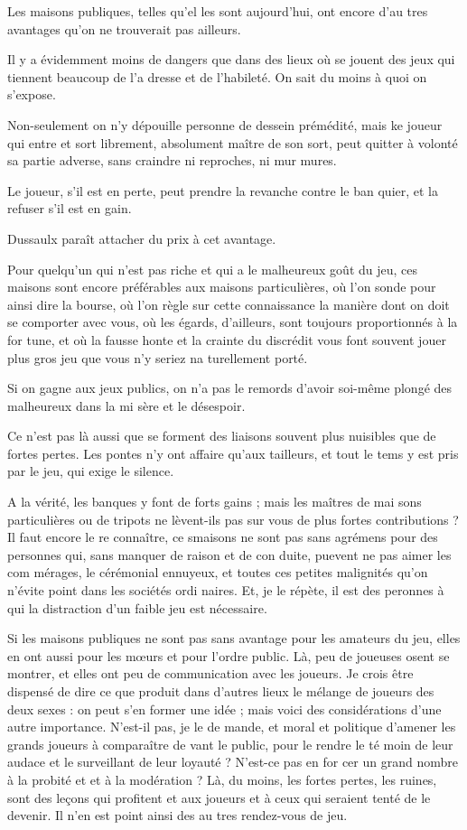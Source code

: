 Les maisons publiques, telles qu'el%
les sont aujourd'hui, ont encore d'au%
tres avantages qu'on ne trouverait
pas ailleurs.

Il y a évidemment moins de dangers
que dans des lieux où se jouent des
jeux qui tiennent beaucoup de l'a%
dresse et de l'habileté. On sait du
moins à quoi on s'expose.

Non-seulement on n'y dépouille
personne de dessein prémédité, mais
ke joueur qui entre et sort librement,
absolument maître de son sort, peut
quitter à volonté sa partie adverse,
sans craindre ni reproches, ni mur%
mures.

Le joueur, s'il est en perte, peut
prendre la revanche contre le ban%
quier, et la refuser s'il est en gain.

Dussaulx paraît attacher du prix à
cet avantage.

Pour quelqu'un qui n'est pas riche
et qui a le malheureux goût du jeu,
ces maisons sont encore préférables
aux maisons particulières, où l'on
sonde pour ainsi dire la bourse, où
l'on règle sur cette connaissance la
manière dont on doit se comporter 
avec vous, où les égards, d'ailleurs,
sont toujours proportionnés à la for%
tune, et où la fausse honte et la crainte
du discrédit vous font souvent jouer
plus gros jeu que vous n'y seriez na%
turellement porté.

Si on gagne aux jeux publics, on
n'a pas le remords d'avoir soi-même
plongé des malheureux dans la mi%
sère et le désespoir.

Ce n'est pas là aussi que se forment
des liaisons souvent plus nuisibles
que de fortes pertes. Les pontes n'y
ont affaire qu'aux tailleurs, et tout
le tems y est pris par le jeu, qui exige 
le silence.

A la vérité, les banques y font de
forts gains ; mais les maîtres de mai%
sons particulières ou de tripots ne
lèvent-ils pas sur vous de plus fortes
contributions ? Il faut encore le re%
connaître, ce smaisons ne sont pas
sans agrémens pour des personnes
qui, sans manquer de raison et de con%
duite, puevent ne pas aimer les com%
mérages, le cérémonial ennuyeux,
et toutes ces petites malignités qu'on
n'évite point dans les sociétés ordi%
naires. Et, je le répète, il est des 
peronnes à qui la distraction d'un
faible jeu est nécessaire.

Si les maisons publiques ne sont 
pas sans avantage pour les amateurs
du jeu, elles en ont aussi pour les
m{\oe}urs et pour l'ordre public. Là,
peu de joueuses osent se montrer, et
elles ont peu de communication avec
les joueurs. Je crois être dispensé de
dire ce que produit dans d'autres lieux
le mélange de joueurs des deux sexes :
on peut s'en former une idée ; mais
voici des considérations d'une autre
importance. N'est-il pas, je le de%
mande, et moral et politique d'amener
les grands joueurs à comparaître de%
vant le public, pour le rendre le té%
moin de leur audace et le surveillant
de leur loyauté ? N'est-ce pas en for%
cer un grand nombre à la probité et
et à la modération ? Là, du moins,
les fortes pertes, les ruines, sont des
leçons qui profitent et aux joueurs
et à ceux qui seraient tenté de le
devenir. Il n'en est point ainsi des au%
tres rendez-vous de jeu.

